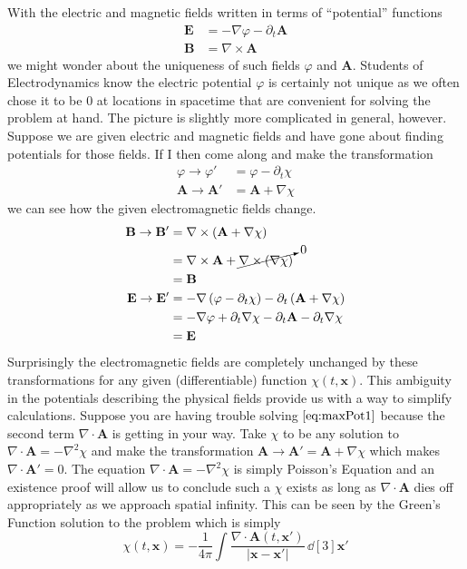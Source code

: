 With the electric and magnetic fields written in terms of ``potential'' functions
\begin{align}
    \mathbf{E} & = -\nabla\varphi - \partial_t\mathbf{A} \label{eq:Epotential}\\
    \mathbf{B} & = \nabla\times\mathbf{A} \label{eq:Bpotential}
\end{align}
we might wonder about the uniqueness of such fields \(\varphi\) and \(\mathbf{A}\).
Students of Electrodynamics know the electric potential \(\varphi\) is certainly
not unique as we often chose it to be 0 at locations in spacetime that are
convenient for solving the problem at hand. The picture is slightly more
complicated in general, however. Suppose we are given electric and magnetic
fields and have gone about finding potentials for those fields. If I then come
along and make the transformation
\begin{align}
    \varphi \to \varphi' & = \varphi - \partial_t\chi \\
    \mathbf{A}\to\mathbf{A}' & = \mathbf{A} + \nabla\chi
\end{align}
we can see how the given electromagnetic fields change.
\begin{align*}
    \mathbf{B}\to\mathbf{B}' & = \nabla\times\left(\mathbf{A} + \nabla\chi\right) \\
                             & = \nabla\times\mathbf{A} + \cancelto{0}{\nabla\times(\nabla\chi)} \\
                             & = \mathbf{B} \\
    \mathbf{E}\to\mathbf{E}' & = -\nabla\left(\varphi - \partial_t\chi\right) - \partial_t\left(\mathbf{A} + \nabla\chi\right) \\
                             & = -\nabla\varphi + \partial_t\nabla\chi - \partial_t\mathbf{A} - \partial_t\nabla\chi \\
                             & = \mathbf{E}
\end{align*}
Surprisingly the electromagnetic fields are completely unchanged by these
transformations for any given (differentiable) function \(\chi(t,\mathbf{x})\).
This ambiguity in the potentials describing the physical fields provide us with
a way to simplify calculations. Suppose you are having trouble solving
\(\ref{eq:maxPot1}\) because the second term \(\nabla\cdot\mathbf{A}\) is
getting in your way. Take \(\chi\) to be any solution to
\(\nabla\cdot\mathbf{A} = -\nabla^2\chi\) and make the transformation
\(\mathbf{A}\to\mathbf{A}'=\mathbf{A} + \nabla\chi\) which makes
\(\nabla\cdot\mathbf{A}' = 0\). The equation \(\nabla\cdot\mathbf{A} = -\nabla^2\chi\)
is simply Poisson's Equation and an existence proof will allow us to conclude
such a \(\chi\) exists as long as \(\nabla\cdot\mathbf{A}\) dies off
appropriately as we approach spatial infinity. This can be seen by the Green's
Function solution to the problem which is simply
\begin{equation*}
    \chi(t, \mathbf{x}) = -\frac{1}{4\pi}\int \frac{\nabla\cdot\mathbf{A}(t,\mathbf{x}')}{|\mathbf{x} - \mathbf{x}'|}\,\dd[3]{\mathbf{x}'}
\end{equation*}

